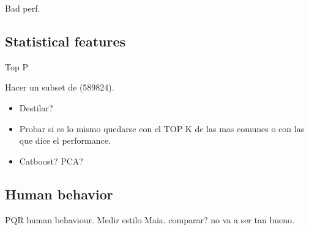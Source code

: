 
Bad perf.

\subsection{Statistical features}

Top P

Hacer un subset de  (589824).

\begin{itemize}
\item Destilar?
\item Probar si es lo mismo quedarse con el TOP K de las mas comunes o con las que dice el performance.
\item Catboost? PCA?
\end{itemize}

\subsection{Human behavior}

PQR human behaviour. Medir estilo Maia. comparar? no va a ser tan bueno.
